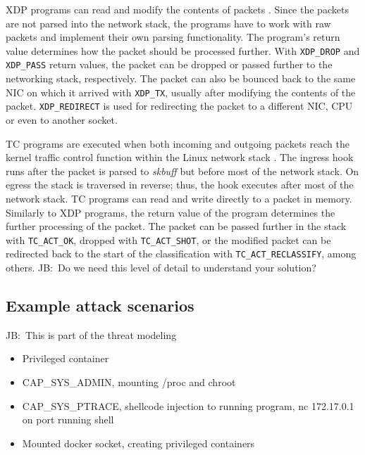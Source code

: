 \documentclass[english, 12pt, a4paper, sci, utf8, a-2b, online]{aaltothesis}
\newcommand{\mycomment}[3]{\textcolor{#1}{#2:~#3}}
\newcommand{\jb}[1]{\noindent\mycomment{aaltoRed}{JB}{#1}}
\begin{document}

XDP programs can read and modify the contents of packets \cite{vieira2020fast}. Since the packets are not parsed into the network stack, the programs have to work with raw packets and implement their own parsing functionality. The program's return value determines how the packet should be processed further. With \texttt{XDP\_DROP} and \texttt{XDP\_PASS} return values, the packet can be dropped or passed further to the networking stack, respectively. The packet can also be bounced back to the same NIC on which it arrived with \texttt{XDP\_TX}, usually after modifying the contents of the packet. \texttt{XDP\_REDIRECT} is used for redirecting the packet to a different NIC, CPU or even to another socket.

TC programs are executed when both incoming and outgoing packets reach the kernel traffic control function within the Linux network stack \cite{vieira2020fast}. The ingress hook runs after the packet is parsed to \textit{skbuff} but before most of the network stack. On egress the stack is traversed in reverse; thus, the hook executes after most of the network stack. TC programs can read and write directly to a packet in memory. Similarly to XDP programs, the return value of the program determines the further processing of the packet. The packet can be passed further in the stack with \texttt{TC\_ACT\_OK}, dropped with \texttt{TC\_ACT\_SHOT}, or the modified packet can be redirected back to the start of the classification with \texttt{TC\_ACT\_RECLASSIFY}, among others.
\jb{Do we need this level of detail to understand your solution?}
\clearpage
\subsection{Example attack scenarios}
\jb{This is part of the threat modeling}

\begin{itemize}
  \item Privileged container
  \item CAP\_SYS\_ADMIN, mounting /proc and chroot
  \item CAP\_SYS\_PTRACE, shellcode injection to running program, nc 172.17.0.1 on port running shell
  \item Mounted docker socket, creating privileged containers
\end{itemize}
\end{document}
